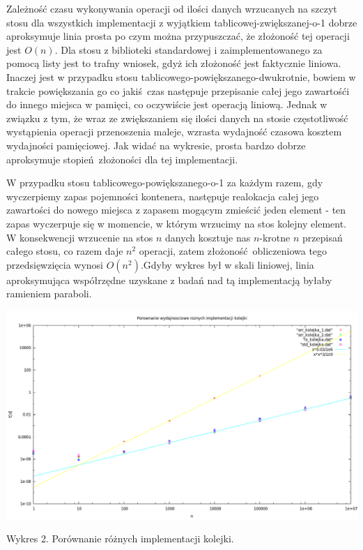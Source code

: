 Zależność czasu wykonywania operacji od ilości danych wrzucanych na szczyt stosu dla wszystkich implementacji z wyjątkiem tablicowej-zwiększanej-o-1 dobrze aproksymuje linia prosta po czym można przypuszczać, że złożoność tej operacji jest \begin{math}O(n)\end{math}. Dla stosu z biblioteki standardowej i zaimplementowanego za pomocą listy jest to trafny wniosek, gdyż ich złożoność jest faktycznie liniowa. Inaczej jest w przypadku stosu tablicowego-powiększanego-dwukrotnie, bowiem w trakcie powiększania go co jakiś czas następuje przepisanie całej jego zawartośći do innego miejsca w pamięci, co oczywiście jest operacją liniową. Jednak w związku z tym, że wraz ze zwiększaniem się ilości danych na stosie częstotliwość wystąpienia operacji przenoszenia maleje, wzrasta wydajność czasowa kosztem wydajności pamięciowej. Jak widać na wykresie, prosta bardzo dobrze aproksymuje stopień złożoności dla tej implementacji.

W przypadku stosu tablicowego-powiększanego-o-1 za każdym razem, gdy wyczerpiemy zapas pojemności kontenera, następuje realokacja całej jego zawartości do nowego miejsca z zapasem mogącym zmieścić jeden element - ten zapas wyczerpuje się w momencie, w którym wrzucimy na stos kolejny element. W konsekwencji wrzucenie na stos \begin{math}n\end{math} danych kosztuje nas \begin{math}n\end{math}-krotne \begin{math}n\end{math} przepisań całego stosu, co razem daje \begin{math}n^{2}\end{math} operacji, zatem złożoność obliczeniowa tego przedsięwzięcia wynosi \begin{math}O(n^{2})\end{math}.Gdyby wykres był w skali liniowej, linia aproksymująca współrzędne uzyskane z badań nad tą implementacją byłaby ramieniem paraboli.
\newpage
\centerline{\includegraphics[width=\textwidth,height=\textheight, keepaspectratio]{kolejka.png}}
Wykres 2. Porównanie różnych implementacji kolejki.
\newline


